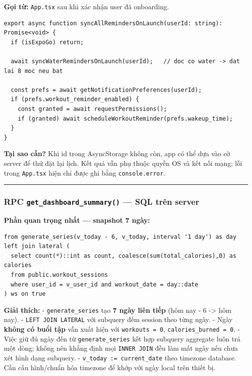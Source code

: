 \documentclass[12pt,a4paper]{article}
\begin{document}
\textbf{Gọi từ:} \texttt{App.tsx} sau khi xác nhận user đã onboarding.

\begin{verbatim}
export async function syncAllRemindersOnLaunch(userId: string): Promise<void> {
  if (isExpoGo) return;

  await syncWaterRemindersOnLaunch(userId);   // doc co water -> dat lai 8 moc neu bat

  const prefs = await getNotificationPreferences(userId);
  if (prefs.workout_reminder_enabled) {
    const granted = await requestPermissions();
    if (granted) await scheduleWorkoutReminder(prefs.wakeup_time);
  }
}

\end{verbatim}

\textbf{Tại sao cần?} Khi id trong AsyncStorage không còn, app có thể
dựa vào cờ server để thử đặt lại lịch. Kết quả vẫn phụ thuộc quyền OS và
kết nối mạng; lỗi trong \texttt{App.tsx} hiện chỉ được ghi bằng
\texttt{console.error}.

\begin{center}\rule{0.5\linewidth}{0.5pt}\end{center}

\subsubsection{\texorpdfstring{RPC \texttt{get\_dashboard\_summary()}
--- SQL trên
server}{RPC get\_dashboard\_summary() --- SQL trên server}}\label{rpc-get_dashboard_summary-sql-truxean-server}

\textbf{Phần quan trọng nhất --- snapshot 7 ngày:}

\begin{verbatim}
from generate_series(v_today - 6, v_today, interval '1 day') as day
left join lateral (
  select count(*)::int as count, coalesce(sum(total_calories),0) as calories
  from public.workout_sessions
  where user_id = v_user_id and workout_date = day::date
) ws on true

\end{verbatim}

\textbf{Giải thích:} - \texttt{generate\_series} tạo \textbf{7 ngày liên
tiếp} (hôm nay - 6 -\textgreater{} hôm nay). -
\texttt{LEFT\ JOIN\ LATERAL} với subquery đếm session theo từng ngày. -
Ngày \textbf{không có buổi tập} vẫn xuất hiện với
\texttt{workouts\ =\ 0}, \texttt{calories\_burned\ =\ 0}. - Việc giữ đủ
ngày đến từ \texttt{generate\_series} kết hợp subquery aggregate luôn
trả một dòng; không nên khẳng định mọi \texttt{INNER\ JOIN} đều làm mất
ngày nếu chưa xét hình dạng subquery. -
\texttt{v\_today\ :=\ current\_date} theo timezone database. Cần cấu
hình/chuẩn hóa timezone để khớp với ngày local trên thiết bị.
\end{document}

